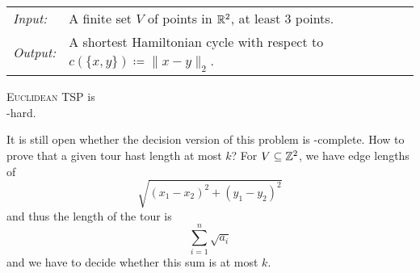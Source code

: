 \documentclass[../skript.tex]{subfiles}
\begin{document}
\begin{problem}
\begin{tabular}{@{}ll}
\textit{Input:} & A finite set $V$ of points in $\mathbb{R}^2$, at least 3 points. \\
\textit{Output:} & A shortest Hamiltonian cycle with respect to $c(\{ x, y\}) \coloneqq \| x - y \|_2$.
\end{tabular}
\end{problem}
\begin{theorem} %
\label{thm:92}
\textsc{Euclidean TSP} is \\ \NP-hard.
\end{theorem}
It is still open whether the decision version of this problem is \NP-complete.
How to prove that a given tour hast length at most $k$? For $V \subseteq \mathbb{Z}^2$, we have edge lengths of
\[
	\sqrt{(x_1 - x_2)^2 + (y_1 - y_2)^2}
\]
and thus the length of the tour is
\[
	\sum_{i=1}^n \sqrt{a_i}
\]
and we have to decide whether this sum is at most $k$.
\end{document}
